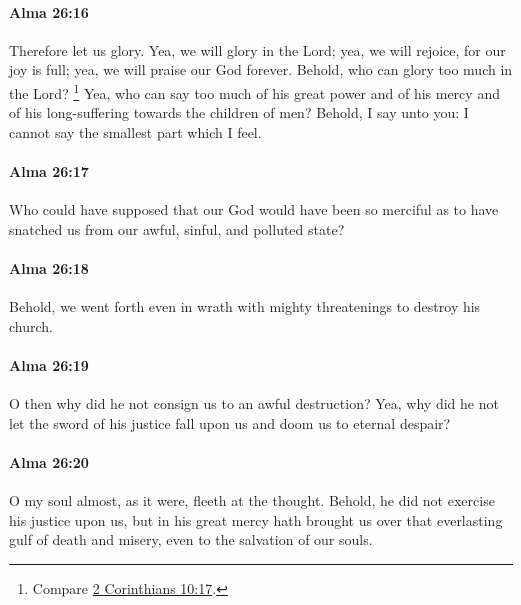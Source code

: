 		\paragraph{Alma 26:16} %
			\label{ALMA-26-16}

			Therefore let us glory.
			Yea, we will glory in the Lord;
			yea, we will rejoice, for our joy is full;
			yea, we will praise our God forever.
			Behold, who can glory too much in the Lord?%
			\footnote{%
				Compare \hyperref[2CORINTHIANS-10-17]{2 Corinthians 10:17}.
				}
			Yea, who can say too much of his great power and of his mercy
			and of his long-suffering towards the children of men?
			Behold, I say unto you:
			I cannot say the smallest part which I feel.

		\paragraph{Alma 26:17} %
			\label{ALMA-26-17}

			Who could have supposed that our God would have been so merciful
			as to have snatched us from our awful, sinful, and polluted state?

		\paragraph{Alma 26:18} %
			\label{ALMA-26-18}

			Behold, we went forth even in wrath
			with mighty threatenings to destroy his church.

		\paragraph{Alma 26:19} %
			\label{ALMA-26-19}

			O then why did he not consign us to an awful destruction?
			Yea, why did he not let the sword of his justice fall upon us
			and doom us to eternal despair?

		\paragraph{Alma 26:20} %
			\label{ALMA-26-20}

			O my soul almost, as it were, fleeth at the thought.
			Behold, he did not exercise his justice upon us,
			but in his great mercy hath brought us
			over that everlasting gulf of death and misery,
			even to the salvation of our souls.

